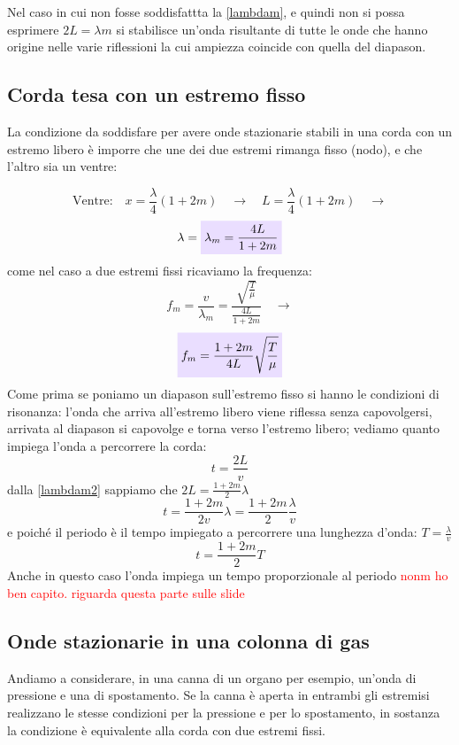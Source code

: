 \documentclass[x11names]{report}
\newcommand{\viola}[1]{\colorbox{yred}{$\displaystyle #1$}}
\begin{document}
	Nel caso in cui non fosse soddisfattta la \ref{lambdam}, e quindi non si possa esprimere \(2L = \lambda m\) si stabilisce un'onda risultante di tutte le onde che hanno origine nelle varie riflessioni la cui ampiezza coincide con quella del diapason.
	
	\subsection{Corda tesa con un estremo fisso}
	La condizione da soddisfare per avere onde stazionarie stabili in una corda con un estremo libero è imporre che une dei due estremi rimanga fisso (nodo), e che l'altro sia un ventre:
	
	\[ 
	\text{Ventre:} \quad x = \frac{\lambda}{4}(1+2m) \quad \to \quad L = \frac{\lambda}{4}(1+2m) \quad \to 
	\]
	\begin{equation}\label{lambdam2}
		\lambda = \viola{\lambda_m  = \frac{4L}{1+2m}}
	\end{equation}
	come nel caso a due estremi fissi ricaviamo la frequenza:
	\[ 
	f_m = \frac{v}{\lambda_m} = \frac{\sqrt{\frac{T}{\mu}}}{\frac{4L}{1+2m}} \quad \to
	\]
	\begin{equation}
		\viola{f_m = \frac{1 + 2m}{4L} \sqrt{\frac{T}{\mu}}}
	\end{equation}
	Come prima se poniamo un diapason sull'estremo fisso si hanno le condizioni di risonanza: l'onda che arriva all'estremo libero viene riflessa senza capovolgersi, arrivata al diapason si capovolge e torna verso l'estremo libero; vediamo quanto impiega l'onda a percorrere la corda:
	\[ 
	t = \frac{2L}{v}
	\]
	dalla \ref{lambdam2} sappiamo che \(2L = \frac{1+2m}{2}\lambda\)
	\[ 
	t = \frac{1+2m}{2v}\lambda = \frac{1+2m}{2}\frac{\lambda}{v}
	\]
	e poiché il periodo è il tempo impiegato a percorrere una lunghezza d'onda: \(T=\frac{\lambda}{v}\)
	\[ 
	t = \frac{1+2m}{2}T
	\]
	Anche in questo caso l'onda impiega un tempo proporzionale al periodo \textcolor{red}{nonm ho ben capito. riguarda questa parte sulle slide}
	
	\subsection{Onde stazionarie in una colonna di gas}
	Andiamo a considerare, in una canna di un organo per esempio, un'onda di pressione e una di spostamento. Se la canna è aperta in entrambi gli estremisi realizzano le stesse condizioni per la pressione e per lo spostamento, in sostanza la condizione è equivalente alla corda con due estremi fissi.
	
\end{document}
